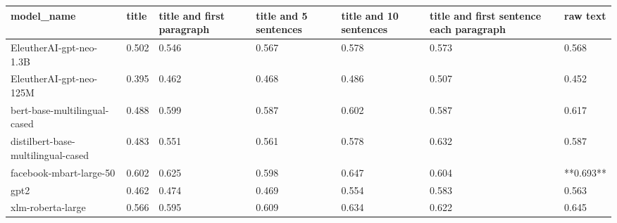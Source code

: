 \begin{tabular}{lllllll}
\toprule
                        model\_name & title & title and first paragraph & title and 5 sentences & title and 10 sentences & title and first sentence each paragraph &  raw text \\
\midrule
           EleutherAI-gpt-neo-1.3B & 0.502 &                     0.546 &                 0.567 &                  0.578 &                                   0.573 &     0.568 \\
           EleutherAI-gpt-neo-125M & 0.395 &                     0.462 &                 0.468 &                  0.486 &                                   0.507 &     0.452 \\
      bert-base-multilingual-cased & 0.488 &                     0.599 &                 0.587 &                  0.602 &                                   0.587 &     0.617 \\
distilbert-base-multilingual-cased & 0.483 &                     0.551 &                 0.561 &                  0.578 &                                   0.632 &     0.587 \\
           facebook-mbart-large-50 & 0.602 &                     0.625 &                 0.598 &                  0.647 &                                   0.604 & **0.693** \\
                              gpt2 & 0.462 &                     0.474 &                 0.469 &                  0.554 &                                   0.583 &     0.563 \\
                 xlm-roberta-large & 0.566 &                     0.595 &                 0.609 &                  0.634 &                                   0.622 &     0.645 \\
\bottomrule
\end{tabular}
